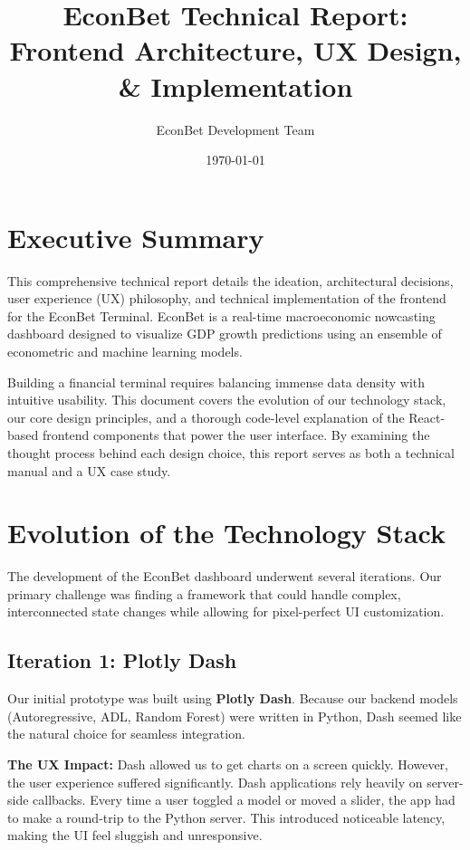 \documentclass[12pt]{article}
\title{\textbf{EconBet Technical Report: Frontend Architecture, UX Design, \& Implementation}}
\author{EconBet Development Team}
\date{\today}
\begin{document}
\maketitle
\thispagestyle{empty}
\newpage

\tableofcontents
\newpage

\section{Executive Summary}
This comprehensive technical report details the ideation, architectural decisions, user experience (UX) philosophy, and technical implementation of the frontend for the EconBet Terminal. EconBet is a real-time macroeconomic nowcasting dashboard designed to visualize GDP growth predictions using an ensemble of econometric and machine learning models. 

Building a financial terminal requires balancing immense data density with intuitive usability. This document covers the evolution of our technology stack, our core design principles, and a thorough code-level explanation of the React-based frontend components that power the user interface. By examining the thought process behind each design choice, this report serves as both a technical manual and a UX case study.

\section{Evolution of the Technology Stack}
The development of the EconBet dashboard underwent several iterations. Our primary challenge was finding a framework that could handle complex, interconnected state changes while allowing for pixel-perfect UI customization.

\subsection{Iteration 1: Plotly Dash}
Our initial prototype was built using \textbf{Plotly Dash}. Because our backend models (Autoregressive, ADL, Random Forest) were written in Python, Dash seemed like the natural choice for seamless integration. 

\textbf{The UX Impact:} Dash allowed us to get charts on a screen quickly. However, the user experience suffered significantly. Dash applications rely heavily on server-side callbacks. Every time a user toggled a model or moved a slider, the app had to make a round-trip to the Python server. This introduced noticeable latency, making the UI feel sluggish and unresponsive.
\end{document}
